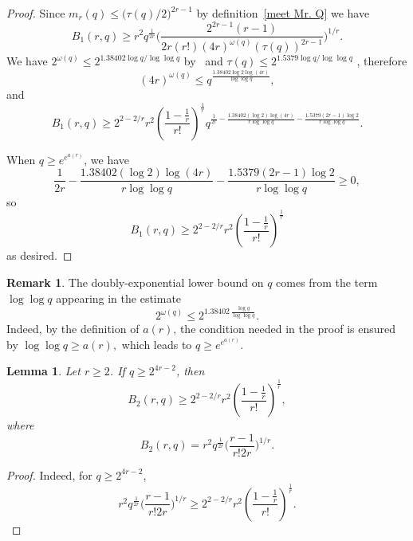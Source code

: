 \documentclass[12pt]{amsart}
\theoremstyle{plain}
\newtheorem{lemma}[theorem]{Lemma}
\theoremstyle{definition}
\newtheorem{remark}[theorem]{Remark}
\begin{document}
\begin{proof} 
Since $m_r(q) \le \bigl( \tau(q)/2 \bigr)^{2r-1}$ by definition~\eqref{meet Mr. Q} %
we have
\[
B_1(r,q) \ge r^2q^{\frac{1}{2r}}\biggl( \frac{2^{2r-1}(r-1)}{2r (r!)(4r)^{\omega(q)}(\tau(q))^{2r-1}} \biggr)^{1/r}. %
\]
We have $2^{\omega(q)} \le 2^{1.38402\log q/\log\log q}$ by~\cite{Nicolas-Robin1983} and $\tau(q) \le 2^{1.5379\log q/\log\log q}$ \cite[Theorem 1]{Nicolas-Robin1983}, therefore
$$(4r)^{\omega(q)}\le q^{\frac{1.38402\log{2} \log{(4r)}}{\log\log{q}}},$$
and
\[
B_1(r,q) \ge 2^{2-2/r}r^2\left(\frac{1-\frac{1}{r}}{r!}\right)^{\frac{1}{r}} q^{\frac{1}{2r}-\frac{1.38402(\log{2})\log{(4r)}}{r \log\log{q}}-\frac{1.5379 (2r-1) \log{2}}{r \log\log{q}}}. %
\]

When $q\ge e^{e^{a(r)}}$, we have
$$\frac{1}{2r} - \frac{1.38402(\log{2})\log{(4r)}}{r \log{\log{q}}}-\frac{1.5379(2r-1)\log{2}}{r \log{\log{q}}} \ge 0,$$
so
$$B_1(r,q) \ge 2^{2-2/r}r^2\left(\frac{1-\frac{1}{r}}{r!}\right)^{\frac{1}{r}}$$
as desired.
\end{proof}
\begin{remark}
The doubly-exponential lower bound on \(q\) comes from the term
\(\log\log q\) appearing in the estimate
$$
2^{\omega(q)}
\le
2^{1.38402\,\frac{\log q}{\log\log q}}.
$$
Indeed, by the definition of \(a(r)\), the condition needed in the proof is
ensured by $
\log\log q \ge a(r),$ which leads to $q \ge e^{e^{a(r)}}.$
\end{remark}

\begin{lemma} \label{B will be at least 10 if it kills us lemma 2}
Let $r\ge 2$. If $q \ge 2^{4r-2}$, then $$B_2(r,q)\ge 2^{2-2/r}r^2\left(\frac{1-\frac{1}{r}}{r!}\right)^{\frac{1}{r}},$$
where 
\begin{equation}\label{def B_2}B_2(r,q) = r^2q^{\frac{1}{2r}}\biggl( \frac{r-1}{r!2r} \biggr)^{1/r}.
\end{equation}
\end{lemma}
\begin{proof}
    Indeed, for $q \ge 2^{4r-2}$,
    $$r^2q^{\frac{1}{2r}}\biggl( \frac{r-1}{r!2r} \biggr)^{1/r} \ge 2^{2-2/r}r^2\left(\frac{1-\frac{1}{r}}{r!}\right)^{\frac{1}{r}}.$$
\end{proof}
\end{document}
